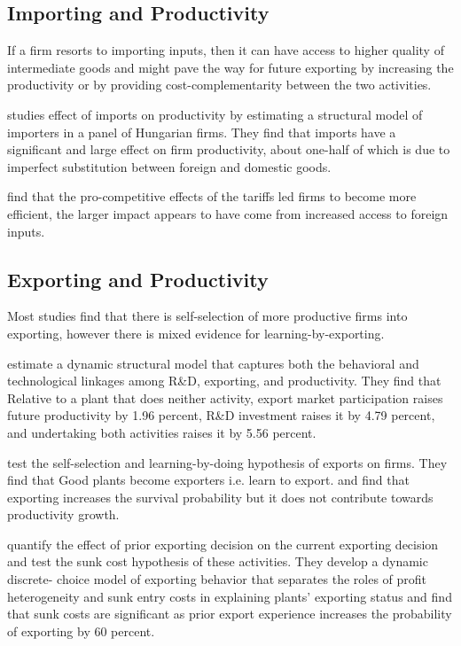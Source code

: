 \documentclass[11pt]{article}
\begin{document}
\subsection{Importing and Productivity}
If a firm resorts to importing inputs, then it can have access to
higher quality of intermediate goods and might pave the way for future
exporting by increasing the productivity or by providing
cost-complementarity between the two activities.  

\cite{halpern2011imported} studies effect of imports on productivity by estimating a structural
model of importers in a panel of Hungarian firms. They find that imports have
a significant and large effect on firm productivity, about one-half of which is due
to imperfect substitution between foreign and domestic goods. 

\cite{topalova2011trade} find that the pro-competitive
effects of the tariffs led firms to become more
efficient, the larger impact appears to have come from 
increased access to foreign inputs.
\subsection{Exporting and Productivity}
Most studies find that there is self-selection of more productive
firms into exporting, however there is mixed evidence for
learning-by-exporting. 

\cite{aw2011}  estimate a dynamic structural model that captures both the behavioral
and technological linkages among R\&D, exporting, and
productivity. They find that Relative to a
plant that does neither activity, export market participation raises future productivity
by 1.96 percent, R\&D investment raises it by 4.79 percent, and undertaking both
activities raises it by 5.56 percent. 

 \cite{bernard1999exceptional} test the self-selection and
 learning-by-doing hypothesis of exports on firms. They find that Good
 plants become exporters i.e. learn to export. and find that exporting
 increases the survival probability but it does not contribute towards
 productivity growth.  

\cite{roberts1997decision} quantify the effect of prior exporting
decision on the current exporting decision and test the sunk cost
hypothesis of these activities.  They  develop a dynamic discrete-
 choice model of exporting behavior that separates the roles of profit heterogeneity
 and sunk entry costs in explaining plants' exporting status and find
 that sunk costs are significant as prior export experience increases
 the probability of exporting by 60 percent.  
\end{document}

